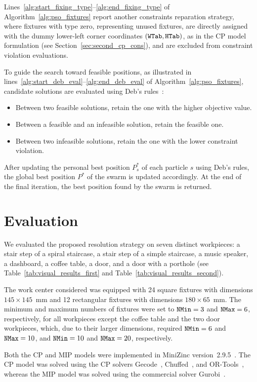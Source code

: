 Lines~\ref{alg:start_fixing_type}--\ref{alg:end_fixing_type} of Algorithm~\ref{alg:pso_fixtures} report another constraints reparation strategy, where fixtures with type zero, representing unused fixtures, are directly assigned with the dummy lower-left corner coordinates $(\mathtt{WTab},\mathtt{HTab})$, as in the CP model formulation (see Section~\ref{sec:second_cp_cons}), and are excluded from constraint violation evaluations.

To guide the search toward feasible positions, as illustrated in lines~\ref{alg:start_deb_eval}--\ref{alg:end_deb_eval} of Algorithm~\ref{alg:pso_fixtures}, candidate solutions are evaluated using Deb’s rules~\cite{deb2000efficient}:
\begin{itemize}
	\item Between two feasible solutions, retain the one with the higher objective value.
	\item Between a feasible and an infeasible solution, retain the feasible one.
	\item Between two infeasible solutions, retain the one with the lower constraint violation.
\end{itemize}

After updating the personal best position $P^*_s$ of each particle $s$ using Deb’s rules, the global best position $P^*$ of the swarm is updated accordingly. At the end of the final iteration, the best position found by the swarm is returned.


\section{Evaluation}
\label{sec:evaluation}
We evaluated the proposed resolution strategy on seven distinct workpieces: a stair step of a spiral staircase, a stair step of a simple staircase, a music speaker, a dashboard, a coffee table, a door, and a door with a porthole (see Table~\ref{tab:visual_results_first} and Table~\ref{tab:visual_results_second}).

The work center considered was equipped with 24 square fixtures with dimensions $145 \times 145$~mm and 12 rectangular fixtures with dimensions $180 \times 65$~mm. The minimum and maximum numbers of fixtures were set to $\mathtt{NMin} = 3$ and $\mathtt{NMax} = 6$, respectively, for all workpieces except the coffee table and the two door workpieces, which, due to their larger dimensions, required $\mathtt{NMin} = 6$ and $\mathtt{NMax} = 10$, and $\mathtt{NMin} = 10$ and $\mathtt{NMax} = 20$, respectively.

Both the CP and MIP models were implemented in MiniZinc version~2.9.5~\cite{nethercote2007minizinc}. The CP model was solved using the CP solvers Gecode~\cite{schulte2006gecode}, Chuffed~\cite{chuffed}, and OR-Tools~\cite{ortools}, whereas the MIP model was solved using the commercial solver Gurobi~\cite{gurobi}.

